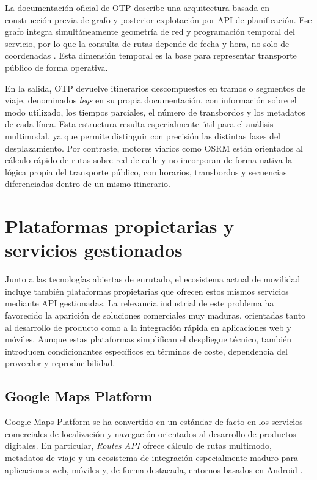 La documentación oficial de OTP describe una arquitectura basada en construcción previa de grafo y posterior explotación por API de planificación. Ese grafo integra simultáneamente geometría de red y programación temporal del servicio, por lo que la consulta de rutas depende de fecha y hora, no solo de coordenadas \cite{OTPBuildConfig,OTPRouteRequest}. Esta dimensión temporal es la base para representar transporte público de forma operativa.

En la salida, OTP devuelve itinerarios descompuestos en tramos o segmentos de viaje, denominados \textit{legs} en su propia documentación, con información sobre el modo utilizado, los tiempos parciales, el número de transbordos y los metadatos de cada línea. Esta estructura resulta especialmente útil para el análisis multimodal, ya que permite distinguir con precisión las distintas fases del desplazamiento. Por contraste, motores viarios como OSRM están orientados al cálculo rápido de rutas sobre red de calle y no incorporan de forma nativa la lógica propia del transporte público, con horarios, transbordos y secuencias diferenciadas dentro de un mismo itinerario.


\section{Plataformas propietarias y servicios gestionados}

Junto a las tecnologías abiertas de enrutado, el ecosistema actual de movilidad incluye también plataformas propietarias que ofrecen estos mismos servicios mediante API gestionadas. La relevancia industrial de este problema ha favorecido la aparición de soluciones comerciales muy maduras, orientadas tanto al desarrollo de producto como a la integración rápida en aplicaciones web y móviles. Aunque estas plataformas simplifican el despliegue técnico, también introducen condicionantes específicos en términos de coste, dependencia del proveedor y reproducibilidad.

\subsection{Google Maps Platform}

Google Maps Platform se ha convertido en un estándar de facto en los servicios comerciales de localización y navegación orientados al desarrollo de productos digitales. En particular, \textit{Routes API} ofrece cálculo de rutas multimodo, metadatos de viaje y un ecosistema de integración especialmente maduro para aplicaciones web, móviles y, de forma destacada, entornos basados en Android \cite{GoogleRoutesAPI}.


